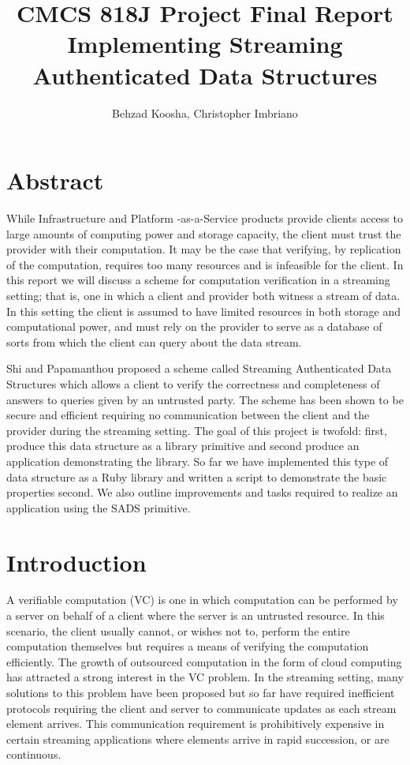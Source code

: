 \documentclass[11pt, letterpaper, oneside]{article}
\begin{document}
\title{\textbf{CMCS 818J Project Final Report} \\ Implementing Streaming Authenticated Data Structures}
\author{Behzad Koosha, Christopher Imbriano}

\maketitle

\section{Abstract}

	While Infrastructure and Platform -as-a-Service products provide clients access to large amounts of computing power and storage capacity, the client must trust the provider with their computation.
	It may be the case that verifying, by replication of the computation, requires too many resources and is infeasible for the client.
	In this report we will discuss a scheme for computation verification in a streaming setting; that is, one in which a client and provider both witness a stream of data.
	In this setting the client is assumed to have limited resources in both storage and computational power, and must rely on the provider to serve as a database of sorts from which the client can query about the data stream.
	
	Shi and Papamanthou \cite{sads} proposed a scheme called Streaming Authenticated Data Structures which allows a client to verify the correctness and completeness of answers to queries given by an untrusted party.
	The scheme has been shown to be secure and efficient requiring no communication between the client and the provider during the streaming setting.
	The goal of this project is twofold: first, produce this data structure as a library primitive and second produce an application demonstrating the library.
	So far we have implemented this type of data structure as a Ruby library and written a script to demonstrate the basic properties second.
	We also outline improvements and tasks required to realize an application using the SADS primitive.


\section{Introduction}

	A verifiable computation (VC) is one in which computation can be performed by a server on behalf of a client where the server is an untrusted resource.
	In this scenario, the client usually cannot, or wishes not to, perform the entire computation themselves but requires a means of verifying the computation efficiently.
	The growth of outsourced computation in the form of cloud computing has attracted a strong interest in the VC problem.
	In the streaming setting, many solutions to this problem have been proposed but so far have required inefficient protocols requiring the client and server to communicate updates as each stream element arrives.
	This communication requirement is prohibitively expensive in certain streaming applications where elements arrive in rapid succession, or are continuous. 
	
\end{document}
